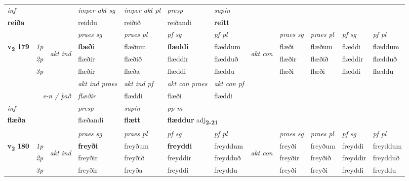 \begin{longtable}[l]{X>{\footnotesize\itshape}llXXXXlXXXX}
\cmidrule{4-7}
   {\textit{inf}} & &  & \textit{imper akt sg} & \textit{imper akt pl}   & \textit{presp} & \textit{supin}   \\*
  {\textbf{reiða}} & && reiddu  & reiðið   & reiðandi &  \textbf{reitt}   \\*

\midrule

 & &   & \textit{praes sg}  & \textit{praes pl}    & \textit{ pf sg} & \textit{pf pl} & & \textit{praes sg}  & \textit{praes pl}    & \textit{pf sg} & \textit{pf pl }  \\ \cmidrule{4-7} \cmidrule{9-12}
 \multirow{2}{*}{{{\textbf{v{\textsubscript{2}}} \Large{\textbf{179}}}}}  & 1p & \multirow{3}{*}{\begin{turn}{90}\textit{akt ind}\end{turn}} & \textbf{flæði} & flæðum & \textbf{flæddi} & flæddum & \multirow{3}{*}{\begin{turn}{90}\textit{akt con}\end{turn}} &flæði & flæðum & flæddi & flæddum\\*
 & 2p &  &  flæðir  & flæðið & flæddir & flædduð & & flæðir & flæðið & flæddir & flædduð \\*
 & 3p &  & flæðir & flæða & flæddi & flæddu & & flæði & flæði& flæddi & flæddu \\*
\cmidrule{4-7} \cmidrule{9-12}

   && &  \textit{akt ind praes} & \textit{akt ind pf} & \textit{akt con praes} & \textit{akt con pf} \\*
\multicolumn{3}{r}{\textit{e-n / það}} & flæðir & flæddi & flæði & flæddi \\*

\cmidrule{4-7}
   {\textit{inf}} & &     & \textit{presp} & \textit{supin}  & \textit{pp m} \\*
  {\textbf{flæða}} & &     & flæðandi &  \textbf{flætt}  & \multicolumn{2}{l}{\textbf{flæddur} adj\textbf{\textsubscript{2-21}}} \\*

\midrule

 & &   & \textit{praes sg}  & \textit{praes pl}    & \textit{ pf sg} & \textit{pf pl} & & \textit{praes sg}  & \textit{praes pl}    & \textit{pf sg} & \textit{pf pl }  \\ \cmidrule{4-7} \cmidrule{9-12}
 \multirow{2}{*}{{{\textbf{v{\textsubscript{2}}} \Large{\textbf{180}}}}}  & 1p & \multirow{3}{*}{\begin{turn}{90}\textit{akt ind}\end{turn}} & \textbf{freyði} & freyðum & \textbf{freyddi} & freyddum & \multirow{3}{*}{\begin{turn}{90}\textit{akt con}\end{turn}} &freyði & freyðum & freyddi & freyddum\\*
 & 2p &  &  freyðir  & freyðið & freyddir & freydduð & & freyðir & freyðið & freyddir & freydduð \\*
 & 3p &  & freyðir & freyða & freyddi & freyddu & & freyði & freyði& freyddi & freyddu \\*
\cmidrule{4-7} \cmidrule{9-12}


\end{longtable}
